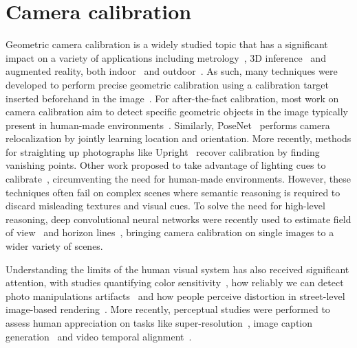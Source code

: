 \section{Camera calibration}


Geometric camera calibration is a widely studied topic that has a significant impact on a variety of applications including metrology~\cite{Criminisi2000}, 3D inference~\cite{Criminisi00,Fouhey2013} and augmented reality, both indoor~\cite{hedau-iccv-09,izadinia-cvpr-17} and outdoor~\cite{hoiem-cvpr-06}. As such, many techniques were developed to perform precise geometric calibration using a calibration target inserted beforehand in the image~\cite{Sturm1999,Zhang2002,Heikkila1997,Chen2004}. For after-the-fact calibration, most work on camera calibration aim to detect specific geometric objects in the image typically present in human-made environments~\cite{Rother2000,Melo2013}. Similarly, PoseNet~\cite{kendall-iccv-15} performs camera relocalization by jointly learning location and orientation. More recently, methods for straighting up photographs like Upright~\cite{Lee2014} recover calibration by finding vanishing points. Other work proposed to take advantage of lighting cues to calibrate~\cite{lalonde-ijcv-10,Workman2014}, circumventing the need for human-made environments. However, these techniques often fail on complex scenes where semantic reasoning is required to discard misleading textures and visual cues. To solve the need for high-level reasoning, deep convolutional neural networks were recently used to estimate field of view~\cite{Workman2015a} and horizon lines~\cite{Workman2016}, bringing camera calibration on single images to a wider variety of scenes.

Understanding the limits of the human visual system has also received significant attention, with studies quantifying color sensitivity~\cite{fairchild2013color}, how reliably we can detect photo manipulations artifacts~\cite{Farid2010} and how people perceive distortion in street-level image-based rendering~\cite{Vangorp2013}. More recently, perceptual studies were performed to assess human appreciation on tasks like super-resolution~\cite{ledig-cvpr-17}, image caption generation~\cite{vinyals-cvpr-15} and video temporal alignment~\cite{papazoglou-accv-16}.

